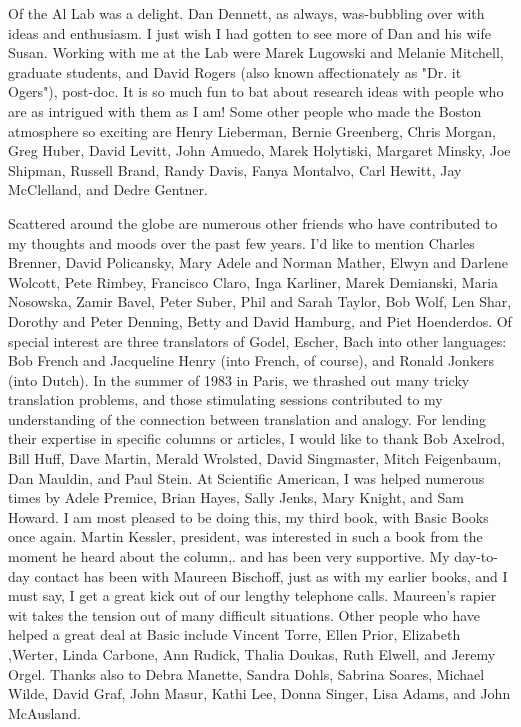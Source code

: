 Of the Al Lab was a delight. Dan Dennett, as always, was-bubbling over with ideas
and enthusiasm. I just wish I had gotten to see more of Dan and his wife Susan.
        Working with me at the Lab were Marek Lugowski and Melanie Mitchell,
graduate students, and David Rogers (also known affectionately as "Dr. it Ogers"),
post-doc. It is so much fun to bat about research ideas with people who are as
intrigued with them as I am!
        Some other people who made the Boston atmosphere so exciting are Henry
Lieberman, Bernie Greenberg, Chris Morgan, Greg Huber, David Levitt, John
Amuedo, Marek Holytiski, Margaret Minsky, Joe Shipman, Russell Brand, Randy
Davis, Fanya Montalvo, Carl Hewitt, Jay McClelland, and Dedre Gentner.

       Scattered around the globe are numerous other friends who have contributed to
my thoughts and moods over the past few years. I'd like to mention Charles Brenner,
David Policansky, Mary Adele and Norman Mather, Elwyn and Darlene Wolcott,
Pete Rimbey, Francisco Claro, Inga Karliner, Marek Demianski, Maria Nosowska,
Zamir Bavel, Peter Suber, Phil and Sarah Taylor, Bob Wolf, Len Shar, Dorothy and
Peter Denning, Betty and David Hamburg, and Piet Hoenderdos.
       Of special interest are three translators of Godel, Escher, Bach into other
languages: Bob French and Jacqueline Henry (into French, of course), and
       Ronald Jonkers (into Dutch). In the summer of 1983 in Paris, we thrashed out
many tricky translation problems, and those stimulating sessions contributed to my
understanding of the connection between translation and analogy.
       For lending their expertise in specific columns or articles, I would like to
thank Bob Axelrod, Bill Huff, Dave Martin, Merald Wrolsted, David Singmaster,
Mitch Feigenbaum, Dan Mauldin, and Paul Stein. At Scientific American, I was
helped numerous times by Adele Premice, Brian Hayes, Sally Jenks, Mary Knight,
and Sam Howard.
       I am most pleased to be doing this, my third book, with Basic Books once
again. Martin Kessler, president, was interested in such a book from the moment he
heard about the column,. and has been very supportive. My day-to-day contact has
been with Maureen Bischoff, just as with my earlier books, and I must say, I get a
great kick out of our lengthy telephone calls. Maureen's rapier wit takes the tension
out of many difficult situations. Other
       people who have helped a great deal at Basic include Vincent Torre, Ellen
       Prior, Elizabeth ,Werter, Linda Carbone, Ann Rudick, Thalia Doukas, Ruth
Elwell, and Jeremy Orgel. Thanks also to Debra Manette, Sandra Dohls, Sabrina
Soares, Michael Wilde, David Graf, John Masur, Kathi Lee, Donna Singer, Lisa
Adams, and John McAusland.

